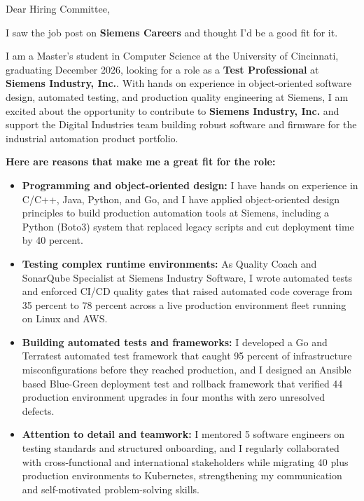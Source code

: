 \documentclass[11pt]{letter}
\date{}
\begin{document}
\begin{letter}{}

\opening{Dear Hiring Committee,}

I saw the job post on \textbf{Siemens Careers} and thought I'd be a good fit for it.

I am a Master's student in Computer Science at the University of Cincinnati, graduating December 2026, looking for a role as a \textbf{Test Professional} at \textbf{Siemens Industry, Inc.}. With hands on experience in object-oriented software design, automated testing, and production quality engineering at Siemens, I am excited about the opportunity to contribute to \textbf{Siemens Industry, Inc.} and support the Digital Industries team building robust software and firmware for the industrial automation product portfolio.

\textbf{Here are reasons that make me a great fit for the role:}

\begin{itemize}[leftmargin=*, itemsep=0.45em]
    \item \textbf{Programming and object-oriented design:} I have hands on experience in C/C++, Java, Python, and Go, and I have applied object-oriented design principles to build production automation tools at Siemens, including a Python (Boto3) system that replaced legacy scripts and cut deployment time by 40 percent.

    \item \textbf{Testing complex runtime environments:} As Quality Coach and SonarQube Specialist at Siemens Industry Software, I wrote automated tests and enforced CI/CD quality gates that raised automated code coverage from 35 percent to 78 percent across a live production environment fleet running on Linux and AWS.

    \item \textbf{Building automated tests and frameworks:} I developed a Go and Terratest automated test framework that caught 95 percent of infrastructure misconfigurations before they reached production, and I designed an Ansible based Blue-Green deployment test and rollback framework that verified 44 production environment upgrades in four months with zero unresolved defects.

    \item \textbf{Attention to detail and teamwork:} I mentored 5 software engineers on testing standards and structured onboarding, and I regularly collaborated with cross-functional and international stakeholders while migrating 40 plus production environments to Kubernetes, strengthening my communication and self-motivated problem-solving skills.
\end{itemize}


\end{letter}
\end{document}
